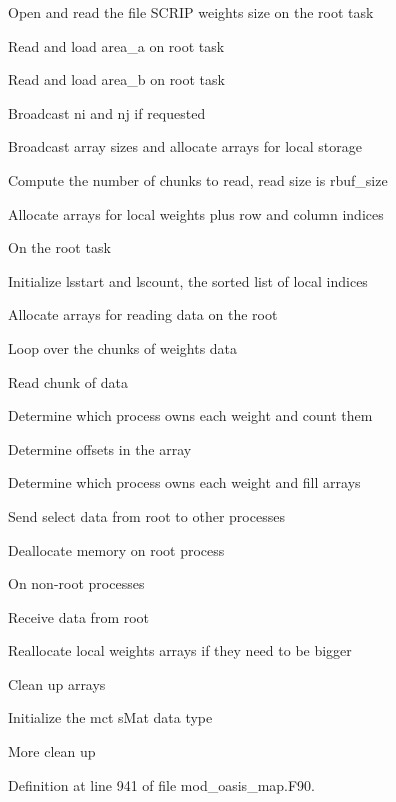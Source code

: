 \begin{DoxyItemize}
\item Open and read the file S\+C\+R\+I\+P weights size on the root task
\item Read and load area\+\_\+a on root task
\item Read and load area\+\_\+b on root task
\item Broadcast ni and nj if requested
\item Broadcast array sizes and allocate arrays for local storage
\item Compute the number of chunks to read, read size is rbuf\+\_\+size
\item Allocate arrays for local weights plus row and column indices
\item On the root task
\begin{DoxyItemize}
\item Initialize lsstart and lscount, the sorted list of local indices
\item Allocate arrays for reading data on the root
\item Loop over the chunks of weights data
\item Read chunk of data
\item Determine which process owns each weight and count them
\item Determine offsets in the array
\item Determine which process owns each weight and fill arrays
\item Send select data from root to other processes
\item Deallocate memory on root process
\end{DoxyItemize}
\item On non-\/root processes
\begin{DoxyItemize}
\item Receive data from root
\item Reallocate local weights arrays if they need to be bigger
\end{DoxyItemize}
\item Clean up arrays
\item Initialize the mct s\+Mat data type
\item More clean up 
\end{DoxyItemize}

Definition at line 941 of file mod\+\_\+oasis\+\_\+map.\+F90.

